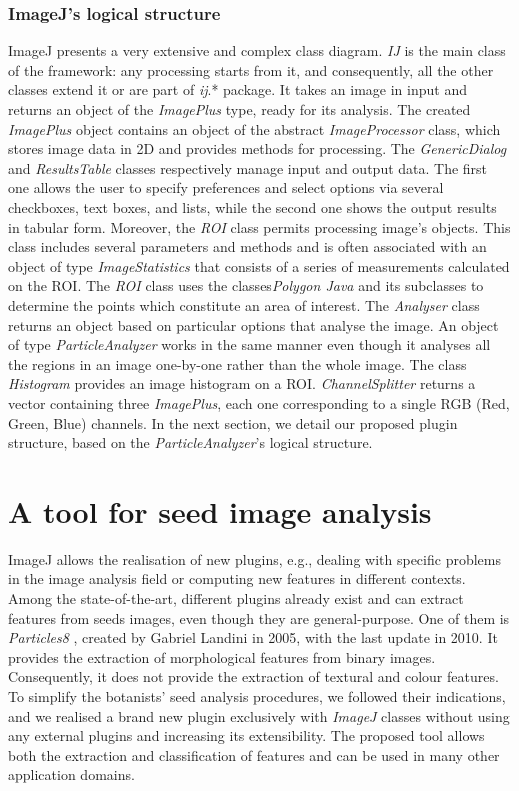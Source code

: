 \documentclass[twocolumn]{svjour3}           %
\begin{document}
\subsubsection{ImageJ's logical structure}
\label{sec:image_logical}
ImageJ presents a very extensive and complex class diagram.
\emph{IJ} is the main class of the framework: any processing starts from it, and consequently, all the other classes extend it or are part of \emph{ij}.* package. It takes an image in input and returns an object of the \emph{ImagePlus} type, ready for its analysis.
The created \emph{ImagePlus} object contains an object of the abstract \emph{ImageProcessor} class, which stores image data in 2D and provides methods for processing.
The \emph{GenericDialog} and \emph{ResultsTable} classes respectively manage input and output data. The first one allows the user to specify preferences and select options via several checkboxes, text boxes, and lists, while the second one shows the output results in tabular form. Moreover, the \emph{ROI} class permits processing image's objects.
This class includes several parameters and methods and is often associated with an object of type \emph{ImageStatistics} that consists of a series of measurements calculated on the ROI. The \emph{ROI} class uses the classes\emph{Polygon Java } and its subclasses to determine the points which constitute an area of interest. The \emph{Analyser} class returns an object based on particular options that analyse the image. An object of type \emph{ParticleAnalyzer} works in the same manner even though it analyses all the regions in an image one-by-one rather than the whole image. 
The class \emph{Histogram} provides an image histogram on a ROI. 
\emph{ChannelSplitter} returns a vector containing three \emph{ImagePlus}, each one corresponding to a single RGB (Red, Green, Blue) channels.
In the next section, we detail our proposed plugin structure, based on the \emph{ParticleAnalyzer}'s logical structure.


\section{A tool for seed image analysis}
\label{sec:tool}
ImageJ allows the realisation of new plugins, e.g., dealing with specific problems in the image analysis field or computing new features in different contexts.
Among the state-of-the-art, different plugins already exist and can extract features from seeds images, even though they are general-purpose. One of them is \emph{Particles8} \cite{Landini}, created by Gabriel Landini in 2005, with the last update in 2010. It provides the extraction of morphological features from binary images. Consequently, it does not provide the extraction of textural and colour features.
To simplify the botanists' seed analysis procedures, we followed their indications, and we realised a brand new plugin exclusively with \emph{ImageJ} classes without using any external plugins and increasing its extensibility. The proposed tool allows both the extraction and classification of features and can be used in many other application domains.
\end{document}
